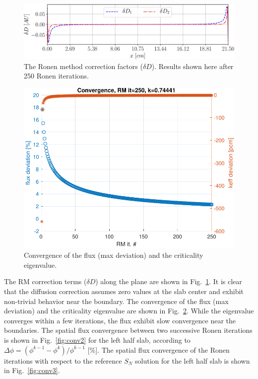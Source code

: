 \begin{figure}[!htbp]
	\centering
	\includegraphics[width=0.65\linewidth]{dD_Tomatis2011_400_250it.pdf}
	\caption{The Ronen method correction factors ($\delta D$). Results shown here after 250 Ronen iterations.}
	\label{fig:slab-RM-corr-factor}
\end{figure}



\begin{figure}[h!]
	\centering
	\includegraphics[width=0.4\linewidth]{convergence.pdf}
	\caption{Convergence of the flux (max deviation) and the criticality
		eigenvalue.}
	\label{fig:conv}
\end{figure}

The RM correction terms ($\delta D$) along the plane are shown in Fig.~\ref{fig:slab-RM-corr-factor}. It is clear that the diffusion correction assumes zero values at the slab center and exhibit non-trivial behavior near the boundary. The convergence of the flux (max deviation) and the criticality eigenvalue are shown in Fig.~\ref{fig:conv}. While the eigenvalue converges within a few iterations, the flux exhibit slow convergence near the boundaries. The spatial flux convergence between two successive Ronen iterations is shown in Fig.~\ref{fig:conv2} for the left half slab, according to $\Delta\phi = (\phi^{k-1}-\phi^k)/\phi^{k-1}$ [\%]. The spatial flux convergence of the Ronen iterations with respect to the reference $S_N$ solution for the left half slab is shown in Fig.~\ref{fig:conv3}.

